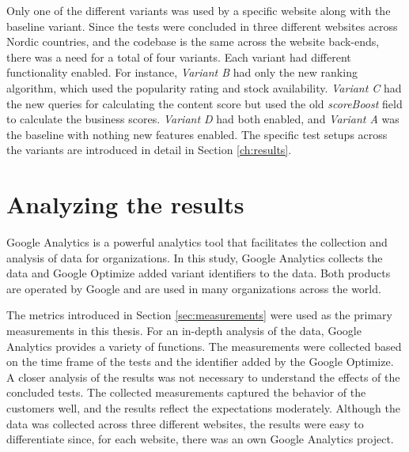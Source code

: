 Only one of the different variants was used by a specific website along with the baseline variant.
Since the tests were concluded in three different websites across Nordic countries, and the codebase is the same
across the website back-ends, there was a need for a total of four variants.
Each variant had different functionality enabled.
For instance, \emph{Variant B} had only the new ranking algorithm,
which used the popularity rating and stock availability.
\emph{Variant C} had the new queries for calculating the
content score but used the old \emph{scoreBoost} field to calculate the business scores.
\emph{Variant D} had both enabled, and \emph{Variant A} was the baseline with nothing new features
enabled.
The specific test setups across the variants are introduced in detail in Section \ref{ch:results}.






\section{Analyzing the results}

Google Analytics is a powerful analytics tool that facilitates the collection and analysis of data for organizations.
In this study, Google Analytics collects the data and Google Optimize added variant identifiers to the data.
Both products are operated by Google and are used in many organizations across the world.


The metrics introduced in Section \ref{sec:measurements} were used as the primary measurements in this thesis.
For an in-depth analysis of the data, Google Analytics provides a variety of functions.
The measurements were collected based on the time frame of the tests and the identifier added by the Google Optimize.
A closer analysis of the results was not necessary to understand the effects of the concluded tests.
The collected measurements captured the behavior of the customers well, and the results reflect the
expectations moderately.
Although the data was collected across three different websites, the results were easy to differentiate since, 
for each website, there was an own Google Analytics project.

